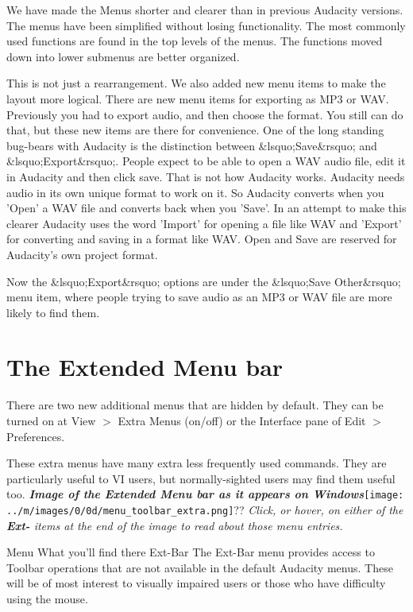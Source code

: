 We have made the Menus shorter and clearer than in previous Audacity versions. The menus have been simplified without losing functionality. The most commonly used functions are found in the top levels of the menus. The functions moved down into lower submenus are better organized.

This is not just a rearrangement.  We also added new menu items to make the layout more logical.  There are new menu items for exporting as MP3 or WAV. Previously you had to export audio, and then choose the format. You still can do that, but these new items are there for convenience.
One of the long standing bug-bears with Audacity is the distinction between \&lsquo;Save\&rsquo; and \&lsquo;Export\&rsquo;. People expect to be able to open a WAV audio file, edit it in Audacity and then click save. That is not how Audacity works. Audacity needs audio in its own unique format to work on it. So Audacity converts when you 'Open' a WAV file and converts back when you 'Save'. In an attempt to make this clearer Audacity uses the word 'Import' for opening a file like WAV and 'Export' for converting and saving in a format like WAV. Open and Save are reserved for Audacity's own project format.

Now the \&lsquo;Export\&rsquo; options are under the \&lsquo;Save Other\&rsquo; menu item, where people trying to save audio as an MP3 or WAV file are more likely to find them. 



\section{The Extended Menu bar}


There are two new additional menus that are hidden by default.  They can be turned on at View \mbox{$>$} Extra Menus (on/off) or the Interface pane of Edit \mbox{$>$} Preferences.

These extra menus have many extra less frequently used commands.  They are particularly useful to VI users, but normally-sighted users may find them useful too.
\textit{\textbf{Image of the Extended Menu bar as it appears on Windows}}\texttt{[image: ../m/images/0/0d/menu\_toolbar\_extra.png]}??
\textit{Click, or hover, on either of the \textbf{Ext-} items at the end of the image to read about those menu entries.}

Menu
What you'll find there
Ext-Bar
The Ext-Bar menu provides access to Toolbar operations that are not available in the default Audacity menus. These will be of most interest to visually impaired users or those who have difficulty using the mouse.

